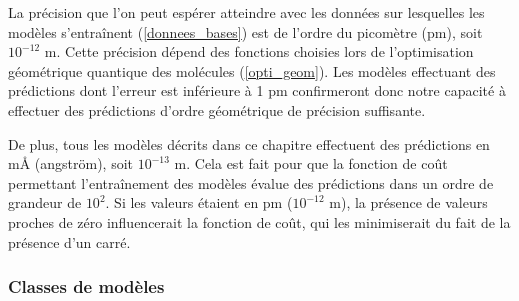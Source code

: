 \par La précision que l'on peut espérer atteindre avec les données sur lesquelles les modèles s'entraînent (\ref{donnees_bases}) est de l'ordre du picomètre (pm), soit $10^{-12}$ m. Cette précision dépend des fonctions choisies lors de l'optimisation géométrique quantique des molécules (\ref{opti_geom}). Les modèles effectuant des prédictions dont l'erreur est inférieure à 1 pm confirmeront donc notre capacité à effectuer des prédictions d'ordre géométrique de précision suffisante.

\par De plus, tous les modèles décrits dans ce chapitre effectuent des prédictions en mÅ (angström), soit $10^{-13}$
m. Cela est fait pour que la fonction de coût permettant l'entraînement des modèles évalue des prédictions dans un ordre de grandeur de $10^2$. Si les valeurs étaient en pm ($10^{-12}$ m), la présence de valeurs proches de zéro influencerait la fonction de coût, qui les minimiserait du fait de la présence d'un carré.

\subsubsection{Classes de modèles}


